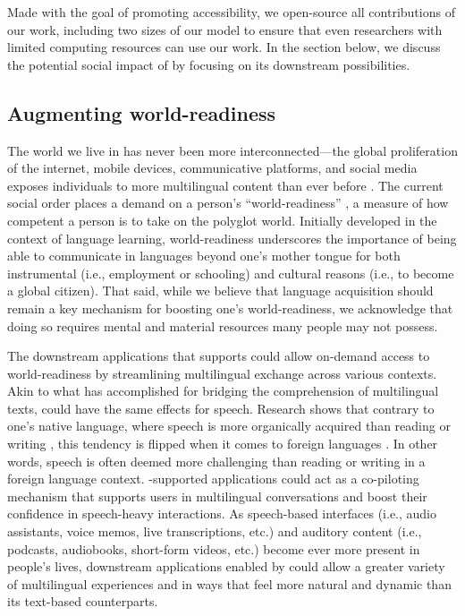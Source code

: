 Made with the goal of promoting accessibility, we open-source all contributions of our work, including two sizes of our model to ensure that even researchers with limited computing resources can use our work. In the section below, we discuss the potential social impact of \mfourt by focusing on its downstream possibilities.

\subsection{Augmenting world-readiness}

The world we live in has never been more interconnected—the global proliferation of the internet, mobile devices, communicative platforms, and social media exposes individuals to more multilingual content than ever before \citep{zuckerman_2008}. The current social order places a demand on a person’s “world-readiness” \citep{ACTFL}, a measure of how competent a person is to take on the polyglot world. Initially developed in the context of language learning, world-readiness underscores the importance of being able to communicate in languages beyond one’s mother tongue for both instrumental (i.e., employment or schooling) and cultural reasons (i.e., to become a global citizen). That said, while we believe that language acquisition should remain a key mechanism for boosting one’s world-readiness, we acknowledge that doing so requires mental and material resources many people may not possess.

The downstream applications that \mfourt supports could allow on-demand access to world-readiness by streamlining multilingual exchange across various contexts. Akin to what \mt{} has accomplished for bridging the comprehension of multilingual texts, \mfourt could have the same effects for speech. Research shows that contrary to one’s native language, where speech is more organically acquired than reading or writing \citep{liberman1992relation}, this tendency is flipped when it comes to foreign languages \citep{cheng1999language}. In other words, speech is often deemed more challenging than reading or writing in a foreign language context. \mfourt-supported applications could act as a co-piloting mechanism that supports users in multilingual conversations and boost their confidence in speech-heavy interactions. As speech-based interfaces (i.e., audio assistants, voice memos, live transcriptions, etc.) and auditory content (i.e., podcasts, audiobooks, short-form videos, etc.) become ever more present in people’s lives, downstream applications enabled by \mfourt could allow a greater variety of multilingual experiences and in ways that feel more natural and dynamic than its text-based counterparts.

